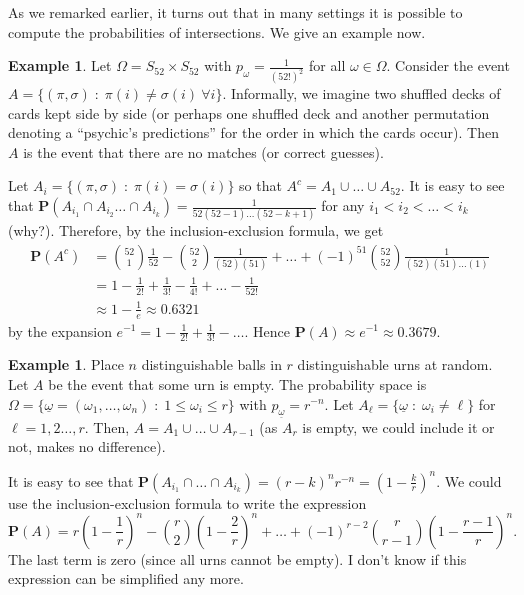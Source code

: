 \documentclass[preprint,  11pt]{amsart}
\def\ome{\omega}
\theoremstyle{plain} %
\theoremstyle{definition} %
\newtheorem{example}[theorem]{Example}
\begin{document}
As we remarked earlier,  it turns out that in many settings it is possible to compute the probabilities of intersections. We give an example now. 
\begin{example} \label{eg:matchingnumerisnearlypoisson} Let $\Omega=S_{52}\times S_{52}$ with $p_{\omega}=\frac{1}{(52!)^{2}}$ for all $\omega \in \Omega$. Consider the event $A=\{(\pi,{\sigma}){\; : \;} \pi(i)\not={\sigma}(i) \ \forall i\}$. Informally, we imagine two shuffled decks of cards kept side by side (or perhaps one shuffled deck and another permutation denoting a  ``psychic's predictions'' for the order in which the cards occur). Then $A$ is the event that there are no matches (or correct guesses).

Let $A_{i}=\{(\pi,{\sigma}){\; : \;} \pi(i)={\sigma}(i)\}$ so that $A^{c}=A_{1}\cup \ldots \cup A_{52}$. It is easy to see that $\mathbf{P}(A_{i_{1}}\cap A_{i_{2}}\ldots \cap A_{i_{k}})=\frac{1}{52(52-1)\ldots (52-k+1)}$ for any $i_{1}<i_{2}<\ldots <i_{k}$ (why?). Therefore, by the inclusion-exclusion formula, we get
\begin{align*}
\mathbf{P}(A^{c}) &=  \binom{52}{1}\frac{1}{52}-\binom{52}{2}\frac{1}{(52)(51)} +  \ldots + (-1)^{51} \binom{52}{52}\frac{1}{(52)(51)\ldots (1)}\\
&= 1-\frac{1}{2!}+\frac{1}{3!}-\frac{1}{4!}+\ldots -\frac{1}{52!} \\
&\approx 1-\frac{1}{e} \approx 0.6321
\end{align*}
by the expansion $e^{-1}=1-\frac{1}{2!}+\frac{1}{3!}-\ldots $. Hence $\mathbf{P}(A)\approx e^{-1}\approx 0.3679$.
\end{example} 
\begin{example}\label{eg:probofemptyurn2} Place $n$ distinguishable balls in $r$ distinguishable urns at random. Let $A$ be the event that some urn is empty. The probability space is $\Omega=\{\underline{\ome}=(\omega_{1},\ldots,\omega_{n}){\; : \;} 1\le \omega_{i}\le r\}$ with $p_{\underline{\ome}}=r^{-n}$. Let $A_{\ell}=\{\underline{\ome}{\; : \;} \omega_{i}\not=\ell\}$ for $\ell=1,2\ldots ,r$. Then, $A=A_{1}\cup \ldots \cup A_{r-1}$ (as $A_{r}$ is empty, we could include it or not, makes no difference).

It is easy to see that $\mathbf{P}(A_{i_{1}}\cap \ldots \cap A_{i_{k}})=(r-k)^{n}r^{-n}=(1-\frac{k}{r})^{n}$. We could use the inclusion-exclusion formula to write the expression
$$
\mathbf{P}(A)=r\left(1-\frac{1}{r}\right)^{n}-\binom{r}{2}\left(1-\frac{2}{r}\right)^{n}+\ldots +(-1)^{r-2}\binom{r}{r-1}\left(1-\frac{r-1}{r}\right)^{n}.
$$
The last term is zero (since all urns cannot be empty). I don't know if this expression can be simplified any more.
\end{example}
\end{document}
